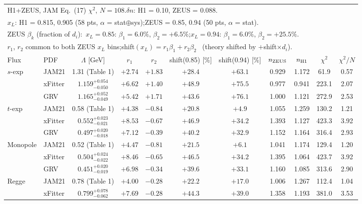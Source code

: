 \documentclass[11pt]{article}
\begin{document}
\begin{tabular}{llccccccccc}
\toprule
\multicolumn{11}{l}{H1+ZEUS, JAM Eq.~(17) $\chi^2$, $N = 108$.\quad $\delta n$: H1 = 0.10, ZEUS = 0.088.} \\
\multicolumn{11}{l}{$x_L$: H1 = 0.815, 0.905 (58 pts, $\alpha$ = stat$\oplus$sys);\quad ZEUS = 0.85, 0.94 (50 pts, $\alpha$ = stat).} \\
\multicolumn{11}{l}{ZEUS $\beta_k$ (fraction of $d_i$):\ $x_L=0.85$: $\beta_1=6.0\%$, $\beta_2=+6.5\%$;\quad $x_L=0.94$: $\beta_1=6.0\%$, $\beta_2=+25.5\%$.} \\
\multicolumn{11}{l}{$r_1$, $r_2$ common to both ZEUS $x_L$ bins;\quad shift$(x_L)=r_1\beta_1+r_2\beta_2$ \ (theory shifted by $+$shift$\times d_i$).} \\
\midrule
Flux & PDF & $\Lambda$ [GeV] & $r_1$ & $r_2$ & shift(0.85) [\%] & shift(0.94) [\%] & $n_{\rm ZEUS}$ & $n_{\rm H1}$ & $\chi^2$ & $\chi^2/N$ \\
\midrule
\multirow{3}{*}{$s$-exp} & JAM21 & 1.31 (Table 1) & $+2.74$ & $+1.83$ & $+28.4$ & $+63.1$ & 0.929 & 1.172 & 61.9 & 0.57 \\
 & xFitter & $1.159^{+0.054}_{-0.050}$ & $+6.62$ & $+1.40$ & $+48.9$ & $+75.5$ & 0.977 & 0.941 & 223.1 & 2.07 \\
 & GRV & $1.165^{+0.052}_{-0.049}$ & $+5.42$ & $+1.71$ & $+43.6$ & $+76.1$ & 1.000 & 1.121 & 272.9 & 2.53 \\
\midrule
\multirow{3}{*}{$t$-exp} & JAM21 & 0.58 (Table 1) & $+4.38$ & $-0.84$ & $+20.8$ & $+4.9$ & 1.055 & 1.259 & 130.2 & 1.21 \\
 & xFitter & $0.552^{+0.023}_{-0.021}$ & $+8.53$ & $-0.67$ & $+46.9$ & $+34.2$ & 1.393 & 1.127 & 423.3 & 3.92 \\
 & GRV & $0.497^{+0.020}_{-0.018}$ & $+7.12$ & $-0.39$ & $+40.2$ & $+32.9$ & 1.152 & 1.164 & 316.4 & 2.93 \\
\midrule
\multirow{3}{*}{Monopole} & JAM21 & 0.52 (Table 1) & $+4.47$ & $-0.81$ & $+21.5$ & $+6.1$ & 1.041 & 1.174 & 129.4 & 1.20 \\
 & xFitter & $0.504^{+0.024}_{-0.022}$ & $+8.46$ & $-0.65$ & $+46.5$ & $+34.2$ & 1.395 & 1.064 & 423.7 & 3.92 \\
 & GRV & $0.451^{+0.020}_{-0.019}$ & $+6.98$ & $-0.34$ & $+39.6$ & $+33.1$ & 1.160 & 1.085 & 313.6 & 2.90 \\
\midrule
\multirow{3}{*}{Regge} & JAM21 & 0.78 (Table 1) & $+4.00$ & $-0.28$ & $+22.2$ & $+17.0$ & 1.006 & 1.267 & 112.4 & 1.04 \\
 & xFitter & $0.799^{+0.078}_{-0.062}$ & $+7.69$ & $-0.28$ & $+44.3$ & $+39.0$ & 1.358 & 1.193 & 381.0 & 3.53 \\

\end{tabular}
\end{document}
